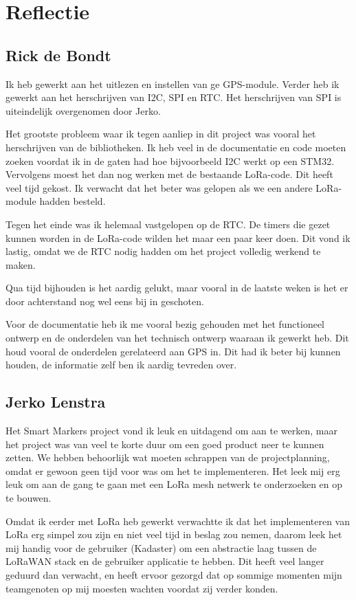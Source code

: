 \section{Reflectie}
\subsection{Rick de Bondt}
Ik heb gewerkt aan het uitlezen en instellen van ge GPS-module. Verder heb ik
gewerkt aan het herschrijven van I2C, SPI en RTC. Het herschrijven van SPI is
uiteindelijk overgenomen door Jerko.

Het grootste probleem waar ik tegen aanliep in dit project was vooral het
herschrijven van de bibliotheken. Ik heb veel in de documentatie en code moeten
zoeken voordat ik in de gaten had hoe bijvoorbeeld I2C werkt op een STM32.
Vervolgens moest het dan nog werken met de bestaande LoRa-code. Dit heeft veel
tijd gekost. Ik verwacht dat het beter was gelopen als we een andere LoRa-module
hadden besteld.

Tegen het einde was ik helemaal vastgelopen op de RTC. De timers
die gezet kunnen worden in de LoRa-code wilden het maar een paar keer doen. Dit
vond ik lastig, omdat we de RTC nodig hadden om het project volledig werkend te
maken.

Qua tijd bijhouden is het aardig gelukt, maar vooral in de laatste weken is het
er door achterstand nog wel eens bij in geschoten.

Voor de documentatie heb ik me vooral bezig gehouden met het functioneel ontwerp
en de onderdelen van het technisch ontwerp waaraan ik gewerkt heb. Dit houd
vooral de onderdelen gerelateerd aan GPS in. Dit had ik beter bij kunnen houden,
de informatie zelf ben ik aardig tevreden over.

\subsection{Jerko Lenstra}
Het Smart Markers project vond ik leuk en uitdagend om aan te werken, maar het
project was van veel te korte duur om een goed product neer te kunnen zetten.
We hebben behoorlijk wat moeten schrappen van de projectplanning, omdat er gewoon
geen tijd voor was om het te implementeren. Het leek mij erg leuk om aan de gang
te gaan met een LoRa mesh netwerk te onderzoeken en op te bouwen.

Omdat ik eerder met LoRa heb gewerkt verwachtte ik dat het implementeren van LoRa
erg simpel zou zijn en niet veel tijd in beslag zou nemen, daarom leek het mij
handig voor de gebruiker (Kadaster) om een abstractie laag tussen de LoRaWAN stack
en de gebruiker applicatie te hebben. Dit heeft veel langer geduurd dan verwacht,
en heeft ervoor gezorgd dat op sommige momenten mijn teamgenoten op mij moesten
wachten voordat zij verder konden.

